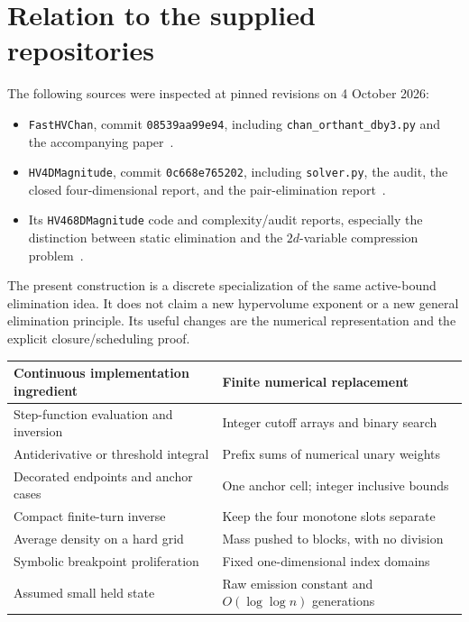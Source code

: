 \documentclass[12pt,a4paper]{article}
\theoremstyle{remark}
\newcommand{\1}{\mathbf1}
\begin{document}
\section{Relation to the supplied repositories}\label{sec:repos}
The following sources were inspected at pinned revisions on 4 October 2026:
\begin{itemize}
\item \texttt{FastHVChan}, commit \texttt{08539aa99e94}, including
      \texttt{chan\_orthant\_dby3.py} and the accompanying paper~\cite{fastrepo}.
\item \texttt{HV4DMagnitude}, commit \texttt{0c668e765202}, including
      \texttt{solver.py}, the audit, the closed four-dimensional report,
      and the pair-elimination report~\cite{magrepo,magreport}.
\item Its \texttt{HV468DMagnitude} code and complexity/audit reports,
      especially the distinction between static elimination and the
      $2d$-variable compression problem~\cite{higherrepo}.
\end{itemize}

The present construction is a discrete specialization of the same
active-bound elimination idea. It does not claim a new hypervolume
exponent or a new general elimination principle. Its useful changes
are the numerical representation and the explicit closure/scheduling proof.

\begin{center}\small
\begin{tabular}{@{}p{.43\linewidth}p{.50\linewidth}@{}}
\toprule
Continuous implementation ingredient&Finite numerical replacement\\\midrule
Step-function evaluation and inversion&Integer cutoff arrays and binary search\\
Antiderivative or threshold integral&Prefix sums of numerical unary weights\\
Decorated endpoints and anchor cases&One anchor cell; integer inclusive bounds\\
Compact finite-turn inverse&Keep the four monotone slots separate\\
Average density on a hard grid&Mass pushed to blocks, with no division\\
Symbolic breakpoint proliferation&Fixed one-dimensional index domains\\
Assumed small held state&Raw emission constant and $O(\log\log n)$ generations\\
\bottomrule
\end{tabular}
\end{center}
\end{document}
